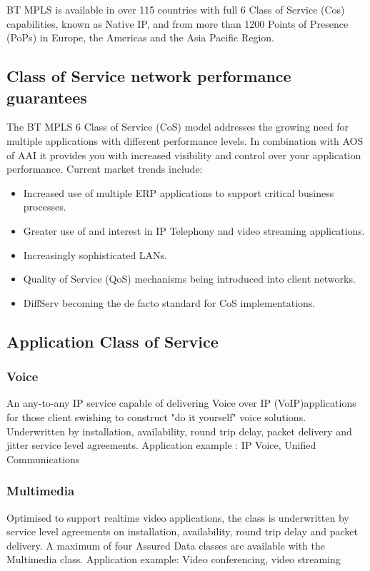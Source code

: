 BT MPLS is available in over 115 countries with full 6 Class of Service (Cos) capabilities, known as Native IP, and from more than 1200 Points of Presence (PoPs) in Europe, the Americas and the Asia Pacific Region.

\subsection{Class of Service network performance guarantees}
The BT MPLS 6 Class of Service (CoS) model addresses the growing need for multiple applications with different performance levels. In combination with AOS of AAI it provides you with increased visibility and control over your application performance. Current market trends include:

\begin{itemize}
\item Increased use of multiple ERP applications to support critical business processes.
\item Greater use of and interest in IP Telephony and video streaming applications.
\item Increasingly sophisticated LANs.
\item Quality of Service (QoS) mechanisms being introduced into client networks.
\item DiffServ becoming the de facto standard for CoS implementations.
\end{itemize}


\subsection{Application Class of Service}

\subsubsection{Voice}
An any-to-any IP service capable of delivering Voice over IP (VoIP)applications for those client swishing to construct "do it yourself" voice solutions. Underwritten by installation, availability, round trip delay, packet delivery and jitter service level agreements.
Application example : IP Voice, Unified Communications

\subsubsection{Multimedia}
Optimised to support realtime video applications, the class is underwritten by service level agreements on installation, availability, round trip delay and packet delivery. A maximum of four Assured Data classes are available with the Multimedia class.
Application example: Video conferencing, video streaming

